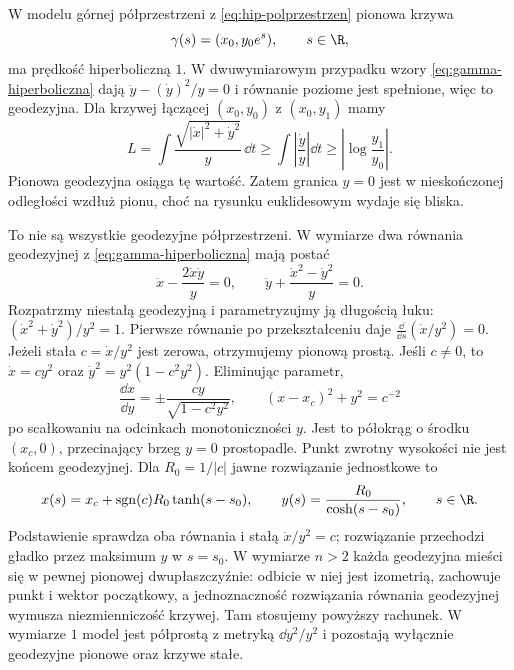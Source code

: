 \begin{przyklad}
\label{prz:geodezyjne-hiperboliczne}
W modelu górnej półprzestrzeni z
\eqref{eq:hip-polprzestrzen} pionowa krzywa
\[
 \gamma(s)=(x_0,y_0e^s),\qquad s\in\R,
\]
ma prędkość hiperboliczną $1$.
W dwuwymiarowym przypadku wzory
\eqref{eq:gamma-hiperboliczna} dają
$\ddot y-(\dot y)^2/y=0$ i równanie
poziome jest spełnione, więc to geodezyjna.
Dla krzywej łączącej $(x_0,y_0)$ z
$(x_0,y_1)$ mamy
\[
 L=\int\frac{\sqrt{|\dot x|^2+\dot y^2}}{y}\,\dd t
 \geq\int\left|\frac{\dot y}{y}\right|\dd t
 \geq\left|\log\frac{y_1}{y_0}\right|.
\]
Pionowa geodezyjna osiąga tę wartość.
Zatem granica $y=0$ jest w nieskończonej
odległości wzdłuż pionu, choć na rysunku
euklidesowym wydaje się bliska.

To nie są wszystkie geodezyjne półprzestrzeni.
W wymiarze dwa równania geodezyjnej z
\eqref{eq:gamma-hiperboliczna} mają postać
\[
 \ddot x-\frac{2\dot x\dot y}{y}=0,
 \qquad
 \ddot y+\frac{\dot x^2-\dot y^2}{y}=0.
\]
Rozpatrzmy niestałą geodezyjną i parametryzujmy ją długością łuku:
$(\dot x^2+\dot y^2)/y^2=1$. Pierwsze równanie
po przekształceniu daje
$\frac{\dd}{\dd s}(\dot x/y^2)=0$.
Jeżeli stała $c=\dot x/y^2$ jest zerowa,
otrzymujemy pionową prostą. Jeśli $c\ne0$,
to $\dot x=cy^2$ oraz
$\dot y^2=y^2(1-c^2y^2)$. Eliminując parametr,
\[
 \frac{\dd x}{\dd y}
   =\pm\frac{cy}{\sqrt{1-c^2y^2}},
 \qquad
 (x-x_c)^2+y^2=c^{-2}
\]
po scałkowaniu na odcinkach monotoniczności $y$.
Jest to półokrąg o środku $(x_c,0)$,
przecinający brzeg $y=0$ prostopadle.
Punkt zwrotny wysokości nie jest końcem geodezyjnej.
Dla $R_0=1/|c|$ jawne rozwiązanie jednostkowe to
\[
 x(s)=x_c+\operatorname{sgn}(c)R_0\tanh(s-s_0),\qquad
 y(s)=\frac{R_0}{\cosh(s-s_0)},\qquad s\in\R.
\]
Podstawienie sprawdza oba równania i stałą $\dot x/y^2=c$;
rozwiązanie przechodzi gładko przez maksimum $y$ w $s=s_0$.
W wymiarze $n>2$ każda geodezyjna mieści się
w pewnej pionowej dwupłaszczyźnie: odbicie
w niej jest izometrią, zachowuje punkt i wektor
początkowy, a jednoznaczność rozwiązania
równania geodezyjnej wymusza niezmienniczość
krzywej. Tam stosujemy powyższy rachunek. W wymiarze $1$
model jest półprostą z metryką $\dd y^2/y^2$ i pozostają
wyłącznie geodezyjne pionowe oraz krzywe stałe.


\end{przyklad}
